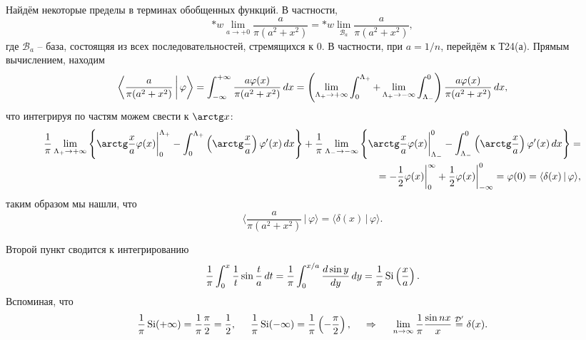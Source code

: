 Найдём некоторые пределы в терминах обобщенных функций. В частности,
\begin{equation*}
    * w \lim_{a\to+0} \frac{a}{\pi (a^2+x^2)} = * w \lim_{\mathcal B_a} \frac{a}{\pi (a^2+x^2)},
\end{equation*}
где $\mathcal B_a$ -- база, состоящяя из всех последовательностей, стремящихся к $0$. 
В частности, при $a=1/n$, перейдём к Т24(а). Прямым вычислением, находим
\begin{equation*}
    \bigg\langle \frac{a}{\pi(a^2+x^2)} \,\bigg|\, \varphi \bigg\rangle  = 
    \int_{-\infty}^{+\infty} \frac{a \varphi(x)}{\pi (a^2+x^2)} \, d x = 
    \left(
    \lim_{\Lambda_+ \to +\infty} \int_{0}^{\Lambda_+} + 
    \lim_{\Lambda_+ \to -\infty} \int_{\Lambda_-}^{0}  
    \right) \frac{a \varphi(x)}{\pi (a^2+x^2)} \, d x,
\end{equation*}
что интегрируя по частям можем свести  к $\arctg x$:
\begin{align*}
    \frac{1}{\pi} \lim_{\Lambda_+ \to +\infty} \left\{
        \arctg \frac{x}{a} \varphi(x) \bigg|_{0}^{\Lambda_+} - 
        \int_{0}^{\Lambda_+} \left(\arctg \frac{x}{a}\right) \varphi' (x) \d x
    \right\} + \frac{1}{\pi} \lim_{\Lambda_- \to -\infty} \left\{
        \arctg \frac{x}{a}\varphi(x) \bigg|_{\Lambda_-}^{0} - \int_{\Lambda_-}^{0}  
        \left(\arctg \frac{x}{a}\right) \varphi' (x) \d x
    \right\}
     = \\ = 
     - \frac{1}{2} \varphi(x) \bigg|_{0}^{\infty}  + \frac{1}{2} \varphi(x) \bigg|_{-\infty}^{0} = \varphi(0) = \langle \delta(x) \,|\, \varphi \rangle,
\end{align*}
таким образом мы нашли, что
\begin{equation*}
    \bigg\langle \frac{a}{\pi(a^2+x^2)} \,\bigg|\, \varphi \bigg\rangle  =  
     \langle \delta(x) \,|\, \varphi \rangle.
\end{equation*}

Второй пункт сводится к интегрированию
\begin{equation*}
    \frac{1}{\pi} \int_{0}^{x}  \frac{1}{t} \sin \frac{t}{a} \, d t = \frac{1}{\pi} \int_{0}^{x/a} \frac{d \sin y}{d y}  \, d y = \frac{1}{\pi} \mathop{\mathrm{Si}}\nolimits\left(\frac{x}{a}\right).
\end{equation*}
Вспоминая, что
\begin{equation*}
    \frac{1}{\pi}\mathop{\mathrm{Si}}\nolimits(+\infty) = \frac{1}{\pi} \frac{\pi}{2} = \frac{1}{2},
    \hspace{5 mm}   
    \frac{1}{\pi} \mathop{\mathrm{Si}}\nolimits(-\infty) = \frac{1}{\pi} \left(-\frac{\pi}{2}\right),
    \hspace{0.5cm} \Rightarrow \hspace{0.5cm}
    \lim_{n\to \infty} \frac{1}{\pi} \frac{\sin nx}{x} \overset{\mathcal D'}{=} \delta(x). 
\end{equation*}



